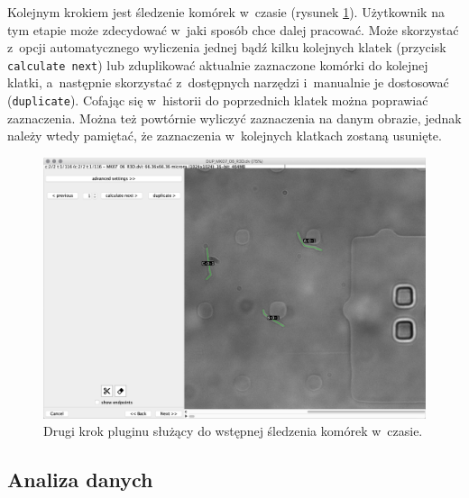 \documentclass[declaration,shortabstract,mgr]{iithesis}
\begin{document}
Kolejnym krokiem jest śledzenie komórek w~czasie (rysunek \ref{fig:ui-step-tracker}).
Użytkownik na tym etapie może zdecydować w~jaki sposób chce dalej pracować.
Może skorzystać z~opcji automatycznego wyliczenia jednej bądź kilku kolejnych klatek (przycisk \texttt{calculate next}) lub zduplikować aktualnie zaznaczone komórki do kolejnej klatki, a~następnie skorzystać z~dostępnych narzędzi i~manualnie je dostosować (\texttt{duplicate}).
Cofając się w~historii do poprzednich klatek można poprawiać zaznaczenia. Można też powtórnie wyliczyć zaznaczenia na danym obrazie, jednak należy wtedy pamiętać, że zaznaczenia w~kolejnych klatkach zostaną usunięte.

\begin{figure}
  \centering
  \includegraphics[width=\textwidth]{images/ui-step-tracker.png}
  \caption{Drugi krok pluginu służący do wstępnej śledzenia komórek w~czasie.}
  \label{fig:ui-step-tracker}
\end{figure}

\subsection{Analiza danych}
\end{document}
